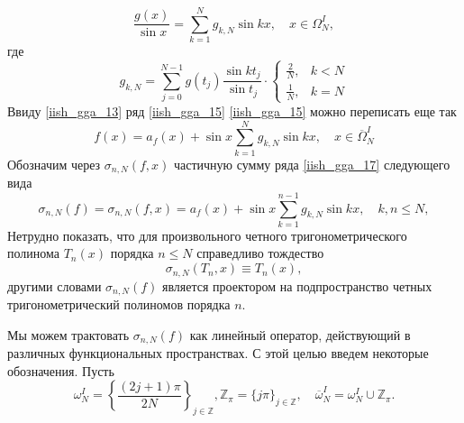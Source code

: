 \begin{equation}
  \frac{g(x)}{\sin x} = \sum\limits_{k=1}^{N} g_{k,N} \sin kx, \quad x \in \Omega_N^I, \label{iish_gga_15}
\end{equation}
где
\begin{equation}
  g_{k,N} = \sum\limits_{j=0}^{N-1} g(t_j) \frac{\sin kt_j}{\sin t_j} \cdot \begin{cases} \frac2N, & k < N \\ \frac1N, & k = N \end{cases} \label{iish_gga_16}
\end{equation}
Ввиду \eqref{iish_gga_13} ряд \eqref{iish_gga_15} \eqref{iish_gga_15} можно переписать еще так
\begin{equation}
  f(x) = a_f(x) + \sin x \sum\limits_{k=1}^{N} g_{k,N} \sin kx, \quad x \in \overline{\Omega}_N^I \label{iish_gga_17}
\end{equation}
Обозначим через $\sigma_{n,N}(f,x)$ частичную сумму ряда \eqref{iish_gga_17} следующего вида
\begin{equation}
  \sigma_{n,N}(f) = \sigma_{n,N}(f,x) = a_f(x) + \sin x \sum\limits_{k=1}^{n-1} g_{k,N} \sin kx, \quad k, n \leq N, \label{iish_gga_18}
\end{equation}
Нетрудно показать, что для произвольного четного тригонометрического полинома $T_n(x)$ порядка $n \leq N$ справедливо тождество
\begin{equation}
  \sigma_{n,N}(T_n, x) \equiv T_n(x), \label{iish_gga_19}
\end{equation}
другими словами $\sigma_{n,N}(f)$  является проектором на подпространство четных тригонометрический полиномов порядка $n$.

Мы можем трактовать $\sigma_{n,N}(f)$ как линейный оператор, действующий в различных функциональных пространствах. С этой целью введем некоторые обозначения. Пусть
\begin{equation*}
  \omega_N^I = \left\{ \frac{(2j+1)\pi}{2N} \right\}_{j \in \mathbb{Z}}, \mathbb{Z}_\pi = \{j\pi\}_{j \in \mathbb{Z}},
  \quad \overline{\omega}_N^I = \omega_N^I \cup \mathbb{Z}_\pi.
\end{equation*}

